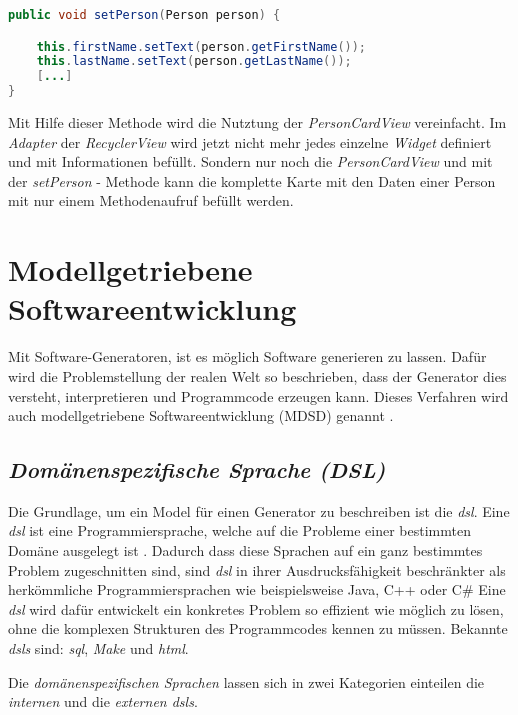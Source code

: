 \begin{lstlisting}[label=lst:setPerson,
language=java,
firstnumber=1,
caption=\textit{setPerson} - Methode aus der \textit{PersonCardView}.]				  
public void setPerson(Person person) {

	this.firstName.setText(person.getFirstName());
	this.lastName.setText(person.getLastName());	
	[...]
}
\end{lstlisting}

\newpage

Mit Hilfe dieser Methode wird die Nutztung der \textit{PersonCardView} vereinfacht. Im \textit{Adapter} der \textit{RecyclerView} wird jetzt nicht mehr jedes einzelne \textit{Widget} definiert und mit Informationen befüllt. Sondern nur noch die \textit{PersonCardView} und mit der \textit{setPerson} - Methode kann die komplette Karte mit den Daten einer Person mit nur einem Methodenaufruf befüllt werden.

\section{Modellgetriebene Softwareentwicklung}\label{sec:generators}

Mit Software-Generatoren, ist es möglich Software generieren zu lassen. Dafür wird die Problemstellung der realen Welt so beschrieben, dass der Generator dies versteht, interpretieren und Programmcode erzeugen kann.
Dieses Verfahren wird auch modellgetriebene Softwareentwicklung (MDSD) genannt \cite{mdsd}.

\subsection{\textit{Domänenspezifische Sprache (DSL)}}\label{sec:dsl}
Die Grundlage, um ein Model für einen Generator zu beschreiben ist die \textit{\acl{dsl}}.
Eine \textit{\acs{dsl}} ist eine Programmiersprache, welche auf die Probleme einer bestimmten Domäne ausgelegt ist \cite{dslHudak}. Dadurch dass diese Sprachen auf ein ganz bestimmtes Problem zugeschnitten sind, sind \textit{\acl{dsl}} in ihrer Ausdrucksfähigkeit beschränkter als herkömmliche Programmiersprachen wie beispielsweise Java, C++ oder C\# Eine \textit{\acl{dsl}} wird dafür entwickelt ein konkretes Problem so effizient wie möglich zu lösen, ohne die komplexen Strukturen des Programmcodes kennen zu müssen.
Bekannte \textit{\aclp{dsl}} sind: \textit{\ac{sql}}, \textit{Make} und \textit{\acf{html}}.

Die \textit{domänenspezifischen Sprachen} lassen sich in zwei Kategorien einteilen die \textit{internen} und die \textit{externen \acsp{dsl}}.

